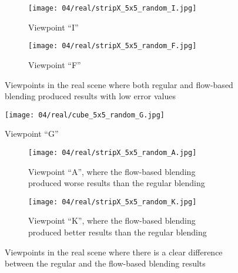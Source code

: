 \begin{figure}
\centering
    \hfill
    \begin{subfigure}[b]{\textwidth}
            \centering
            \texttt{[image: 04/real/stripX\_5x5\_random\_I.jpg]}
            \caption{Viewpoint ``I''}
    \end{subfigure}
    \hfill

    \hfill
    \begin{subfigure}[b]{\textwidth}
            \centering
            \texttt{[image: 04/real/stripX\_5x5\_random\_F.jpg]}
            \caption{Viewpoint ``F''}
    \end{subfigure}
    \hfill
  \caption{Viewpoints in the real scene where both regular and flow-based blending produced results with low error values} \label{fig:real_good}
\end{figure}

\begin{figure}
		\centering
    \texttt{[image: 04/real/cube\_5x5\_random\_G.jpg]}
		\caption{Viewpoint ``G''}
		\label{fig:real_G}
\end{figure}

\begin{figure}
\centering
    \hfill
    \begin{subfigure}[b]{\textwidth}
            \centering
            \texttt{[image: 04/real/stripX\_5x5\_random\_A.jpg]}
            \caption{Viewpoint ``A'', where the flow-based blending produced worse results than the regular blending}
    \end{subfigure}
    \hfill

    \hfill
    \begin{subfigure}[b]{\textwidth}
            \centering
            \texttt{[image: 04/real/stripX\_5x5\_random\_K.jpg]}
            \caption{Viewpoint ``K'', where the flow-based blending produced better results than the regular blending}
    \end{subfigure}
    \hfill
  \caption{Viewpoints in the real scene where there is a clear difference between the regular and the flow-based blending results} \label{fig:real_good_bad}
\end{figure}

